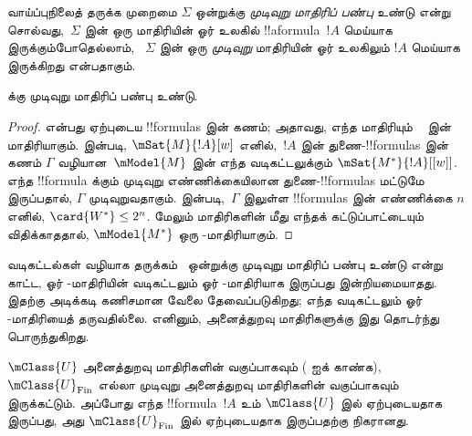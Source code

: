 \documentclass[../../../include/open-logic-section]{subfiles}
\begin{document}


\begin{defn}
  வாய்ப்புநிலைத் தருக்க முறைமை $\Sigma$ ஒன்றுக்கு
  \emph{முடிவுறு மாதிரிப் பண்பு} உண்டு என்று சொல்வது,~$\Sigma$ இன் ஒரு
  மாதிரியின் ஓர் உலகில் !!a{formula}~$!A$ மெய்யாக இருக்கும்போதெல்லாம்,
  ~$\Sigma$ இன் ஒரு \emph{முடிவுறு} மாதிரியின் ஓர் உலகிலும் $!A$ மெய்யாக
  இருக்கிறது என்பதாகும்.
\end{defn}

\begin{prop}
   க்கு முடிவுறு மாதிரிப் பண்பு உண்டு.
\end{prop}

\begin{proof}
   என்பது ஏற்புடைய !!{formula}s இன் கணம்; அதாவது, எந்த மாதிரியும்
  ~ இன் மாதிரியாகும்.  இன்படி,
  $\mSat{M}{!A}[w]$ எனில்,~$!A$ இன் துணை-!!{formula}s இன் கணம்
  $\Gamma$ வழியான~$\mModel{M}$ இன் எந்த வடிகட்டலுக்கும்
  $\mSat{M^*}{!A}[{[w]}]$.
  எந்த !!{formula} க்கும் முடிவுறு எண்ணிக்கையிலான துணை-!!{formula}s மட்டுமே
  இருப்பதால், $\Gamma$ முடிவுறுவதாகும்.
   இன்படி,~$\Gamma$ இலுள்ள
  !!{formula}s இன் எண்ணிக்கை $n$ எனில், $\card{W^*} \le 2^n$.
  மேலும்  மாதிரிகளின் மீது எந்தக் கட்டுப்பாட்டையும் விதிக்காததால்,
  $\mModel{M^*}$ ஒரு -மாதிரியாகும்.
\end{proof}

வடிகட்டல்கள் வழியாக தருக்கம்~ ஒன்றுக்கு முடிவுறு மாதிரிப் பண்பு உண்டு
என்று காட்ட, ஓர் -மாதிரியின் வடிகட்டலும் ஓர் -மாதிரியாக
இருப்பது இன்றியமையாதது. இதற்கு அடிக்கடி கணிசமான வேலை தேவைப்படுகிறது;
எந்த வடிகட்டலும் ஓர் -மாதிரியைத் தருவதில்லை. எனினும், அனைத்துறவு
மாதிரிகளுக்கு இது தொடர்ந்து பொருந்துகிறது.

\begin{prop}
  $\mClass{U}$ அனைத்துறவு மாதிரிகளின் வகுப்பாகவும்
  ( ஐக் காண்க),
  $\mClass{U}_\mathrm{Fin}$ எல்லா முடிவுறு அனைத்துறவு மாதிரிகளின்
  வகுப்பாகவும் இருக்கட்டும். அப்போது எந்த !!{formula}~$!A$ உம்
  $\mClass{U}$ இல் ஏற்புடையதாக இருப்பது, அது
  $\mClass{U}_\mathrm{Fin}$ இல் ஏற்புடையதாக இருப்பதற்கு நிகரானது.
\end{prop}
\end{document}
